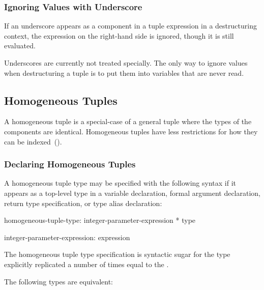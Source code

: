 \subsubsection{Ignoring Values with Underscore}
\label{Ignoring_Values_with_Underscore}

If an underscore appears as a component in a tuple expression in a
destructuring context, the expression on the right-hand side is
ignored, though it is still evaluated.

\begin{status}
Underscores are currently not treated specially.  The only way to
ignore values when destructuring a tuple is to put them into variables
that are never read.
\end{status}

\subsection{Homogeneous Tuples}
\label{Homogeneous_Tuples}

A homogeneous tuple is a special-case of a general tuple where the
types of the components are identical.  Homogeneous tuples have less
restrictions for how they can be indexed~().

\subsubsection{Declaring Homogeneous Tuples}
\label{Declaring_Homogeneous_Tuples}


A homogeneous tuple type may be specified with the following syntax if
it appears as a top-level type in a variable declaration, formal
argument declaration, return type specification, or type alias
declaration:
\begin{syntax}
homogeneous-tuple-type:
  integer-parameter-expression * type

integer-parameter-expression:
  expression
\end{syntax}
The homogeneous tuple type specification is syntactic sugar for the
type explicitly replicated a number of times equal to the
.
\begin{example}
The following types are equivalent:
\begin{center}
 \hspace{2pc} 
\end{center}
\end{example}

